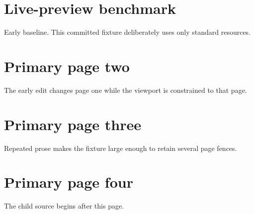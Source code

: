 \documentclass{article}
\newcommand{\PreviewEarly}{Early baseline}
\begin{document}
\section*{Live-preview benchmark}
\PreviewEarly. This committed fixture deliberately uses only standard resources.

\newpage
\section*{Primary page two}
The early edit changes page one while the viewport is constrained to that page.

\newpage
\section*{Primary page three}
Repeated prose makes the fixture large enough to retain several page fences.

\newpage
\section*{Primary page four}
The child source begins after this page.


\end{document}
